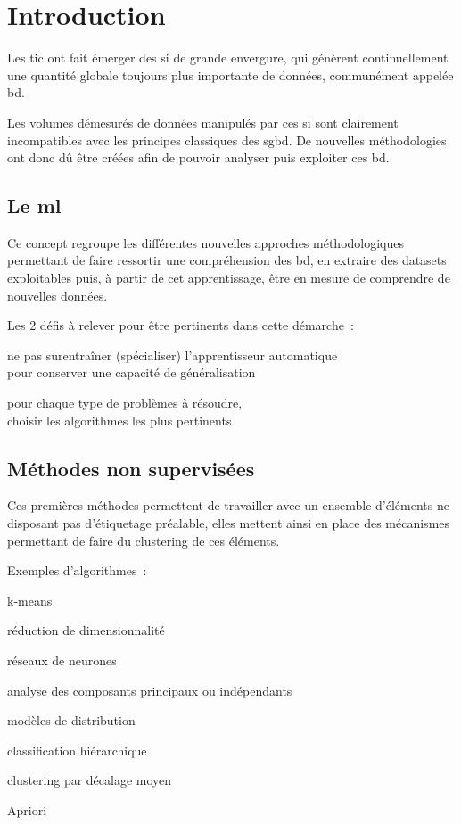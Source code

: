 \section{Introduction}

Les \gls{tic} ont fait émerger des \gls{si} de grande envergure, qui génèrent
continuellement une quantité globale toujours plus importante de données,
communément appelée \gls{bd}.

Les volumes démesurés de données manipulés par ces \gls{si} sont clairement
incompatibles avec les principes classiques des \gls{sgbd}.
De nouvelles méthodologies ont donc dû être créées afin de pouvoir
analyser puis exploiter ces \gls{bd}.

\subsection{Le \gls{ml}}

Ce concept regroupe les différentes nouvelles approches méthodologiques
permettant de faire ressortir une compréhension des \gls{bd}, en extraire
des \glspl{dataset} exploitables puis, à partir de cet apprentissage,
être en mesure de comprendre de nouvelles données.

Les 2 défis à relever pour être pertinents dans cette démarche :
\begin{itmz}
\item{ne pas surentraîner (spécialiser) l’apprentisseur automatique\\
pour conserver une capacité de généralisation}
\item{pour chaque type de problèmes à résoudre,\\
choisir les algorithmes les plus pertinents}
\end{itmz}

\subsection{Méthodes non supervisées}

Ces premières méthodes permettent de travailler avec un ensemble d’éléments
ne disposant pas d’étiquetage préalable, elles mettent ainsi en place
des mécanismes permettant de faire du \gls{clustering} de ces éléments.

Exemples d’algorithmes :
\begin{itmz}
\item{k-means}
\item{réduction de dimensionnalité}
\item{réseaux de neurones}
\item{analyse des composants principaux ou indépendants}
\item{modèles de distribution}
\item{classification hiérarchique}
\item{\gls{clustering} par décalage moyen}
\item{Apriori}
\end{itmz}

